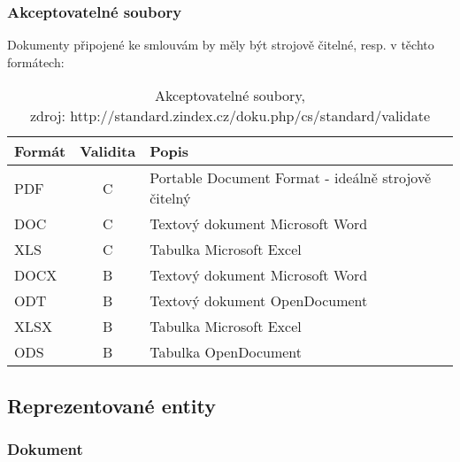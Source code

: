 \subsubsection*{Akceptovatelné soubory}

Dokumenty připojené ke smlouvám by měly být strojově čitelné, resp. v těchto formátech:

\begin{table}[h]
\centering
\begin{tabular}{lcl}
\textbf{Formát} & \textbf{Validita} & \textbf{Popis} \\
\hline
\rowcolor{validateC}PDF & C & Portable Document Format - ideálně strojově čitelný \\
\rowcolor{validateC}DOC & C & Textový dokument Microsoft Word \\
\rowcolor{validateC}XLS & C & Tabulka Microsoft Excel \\
\rowcolor{validateB}DOCX & B & Textový dokument Microsoft Word \\
\rowcolor{validateB}ODT & B & Textový dokument OpenDocument \\
\rowcolor{validateB}XLSX & B & Tabulka Microsoft Excel \\
\rowcolor{validateB}ODS & B & Tabulka OpenDocument \\
\end{tabular}
\caption{Akceptovatelné soubory,\\zdroj: http://standard.zindex.cz/doku.php/cs/standard/validate}
\end{table}

\newpage

\subsection{Reprezentované entity}

\medskip

\subsubsection*{Dokument}

